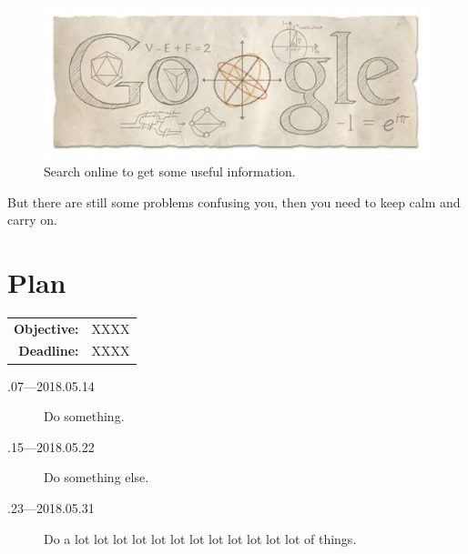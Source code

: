 \documentclass[a4paper]{article}
\begin{document}
\begin{figure}[hb]
    \centering
    \includegraphics{figures/google}
    \caption{Search online to get some useful information.}
    \label{fig:google}
\end{figure}

But there are still some problems confusing you, then you need to keep calm and carry on.

\section{Plan}

\begin{tabular}{rl}
	\textbf{Objective:} & XXXX \\
    \textbf{Deadline:} & XXXX 
\end{tabular}

\begin{description}
    \item[.07---2018.05.14] Do something.
    \item[.15---2018.05.22] Do something else.
    \item[.23---2018.05.31] Do a lot lot lot lot lot lot lot lot lot lot lot lot of things.
\end{description}



\end{document}
